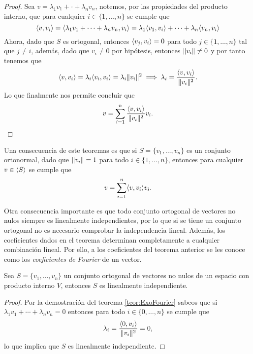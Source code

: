 \begin{proof}
  Sea $v = \lambda_1 v_1 + \cdot + \lambda_n v_n$, notemos, por las propiedades del producto interno, que para cualquier $i \in \{1,\ldots,n\}$ se cumple que
  \[
    \langle v,v_i\rangle = \langle\lambda_1 v_1 + \cdots + \lambda_n v_n,v_i\rangle 
      = \lambda_1 \langle v_1,v_i\rangle + \cdots + \lambda_n \langle v_n,v_i\rangle
  \]
  Ahora, dado que $S$ es ortogonal, entonces $\langle v_j, v_i\rangle = 0$ para todo $j \in \{1,\ldots,n\}$ tal que $j \neq i$, además, dado que $v_i \neq 0$ por hipótesis, entonces $\mathopen\|v_i\mathclose\| \neq 0$ y por tanto tenemos que
  \[
    \langle v,v_i\rangle = \lambda_i \langle v_i,v_i\rangle = \lambda_i \mathopen\|v_i\mathclose\|^2 \implies \lambda_i = \frac{\langle v,v_i\rangle}{\mathopen\|v_i\mathclose\|^2}.
  \]
  Lo que finalmente nos permite concluir que 
    \[
      v = \sum_{i=1}^n \frac{\langle v,v_i\rangle}{\mathopen\|v_i\mathclose\|^2} v_i. \qedhere
    \]
\end{proof}

Una consecuencia de este teoremas es que si $S = \{v_1, \ldots, v_n\}$ es un conjunto ortonormal, dado que $\mathopen\|v_i\mathclose\| = 1$ para todo $i\in\{1,\ldots,n\}$, entonces para cualquier $v\in \langle S\rangle$ se cumple que 
\[
  v = \sum_{i=1}^n \langle v,v_i\rangle v_i.
\]

Otra consecuencia importante es que todo conjunto ortogonal de vectores no nulos siempre es linealmente independientes, por lo que si se tiene un conjunto ortogonal no es necesario comprobar la independencia lineal. Además, los coeficientes dados en el teorema determinan completamente a cualquier combinación lineal. Por ello, a los coeficientes del teorema anterior se les conoce como los \emph{coeficientes de Fourier} de un vector.

\begin{coro}
  Sea $S = \{v_1, \ldots, v_n\}$ un conjunto ortogonal de vectores no nulos de un espacio con producto interno $V$, entonces $S$ es linealmente independiente.
\end{coro}
\begin{proof}
  Por la demostración del teorema \ref{teor:ExoFourier} sabeos que si $\lambda_1 v_1 + \cdots + \lambda_n v_n = 0$ entonces para todo $i \in  \{0,\ldots,n\}$ se cumple que
    \[
      \lambda_i = \frac{\langle0,v_i\rangle}{\mathopen\|v_i\mathclose\|^2} = 0,
    \]
  lo que implica que $S$ es linealmente independiente.
\end{proof}